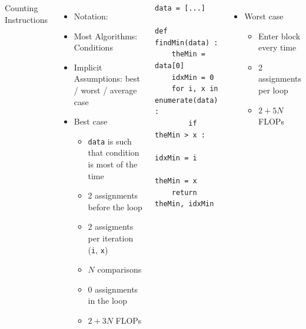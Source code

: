 \begin{frame}[fragile]
%
\begin{columns}[T]
\begin{Large}
	{Counting Instructions}
	\vspace{6pt}
\end{Large}
%
\begin{itemize}
\item Notation: 
\item Most Algorithms: Conditions
\item Implicit Assumptions: best / worst / average case
\item Best case
	\begin{itemize}
	\item \texttt{data} is such that  condition is  most of the time
	\item 2 assignments before the loop
	\item 2 assigments per iteration (\texttt{i}, \texttt{x})
	\item $N$ comparisons
	\item 0 assignments in the loop
	\item[\Thus] $2 + 3N$ FLOPs
	\end{itemize}
\end{itemize}
%
\begin{codebox}
\begin{verbatim}
data = [...]

def findMin(data) :
    theMin = data[0]
    idxMin = 0
    for i, x in enumerate(data) :
        if theMin > x :
            idxMin = i
            theMin = x
    return theMin, idxMin
\end{verbatim}
\end{codebox}
%
\begin{itemize}
\item Worst case
	\begin{itemize}
	\item Enter  block every time
	\item 2 assignments per loop
	\item[\Thus] $2 + 5N$ FLOPs
	\end{itemize}
\end{itemize}
\end{columns}
%
\end{frame}


